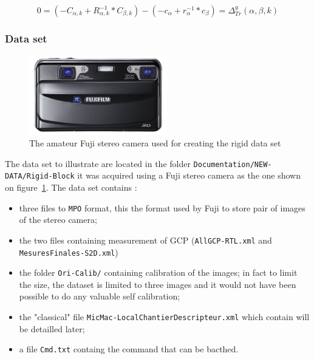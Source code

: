 \begin{equation}
     0 = (- C_{\alpha,k}  + R_{\alpha,k}^{-1} * C_{\beta,k}) -(- c_{\alpha}  + r_{\alpha}^{-1} * c_{\beta})
      = \Delta^g_{Tr}(\alpha,\beta,k)
     \label{EQ:RIG5}
\end{equation}


\subsubsection{Data set}

\begin{figure}
\begin{center}
   \includegraphics[width=60mm]{FIGS/Rigid-Block/Fuji.jpg}
\end{center}
\caption{The amateur Fuji stereo camera used for  creating the rigid data set}
\label{ImFuji}
\end{figure}

The data set to illustrate are located in the folder {\tt Documentation/NEW-DATA/Rigid-Block} it was acquired using
a Fuji stereo camera as the one shown on figure~\ref{ImFuji}. The data set contains :

\begin{itemize}
    \item three files to {\tt MPO}  format, this the format used by Fuji to store pair of images of the stereo camera;
    \item the two files containing measurement of GCP ({\tt AllGCP-RTL.xml} and {\tt MesuresFinales-S2D.xml})
    \item the folder {\tt Ori-Calib/} containing calibration of the images; in fact to limit the size, the dataset
          is limited to three images and it would not have been possible to do any valuable self calibration;

    \item the "classical" file {\tt MicMac-LocalChantierDescripteur.xml} which contain will be detailled later;
    \item a file {\tt Cmd.txt} containg the command that can be bacthed.
\end{itemize}


